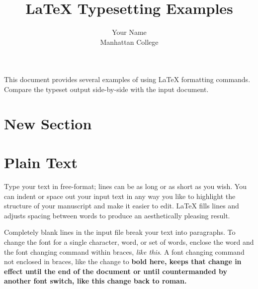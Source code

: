 \documentclass[11pt]{article}
\begin{document}
\title{LaTeX Typesetting Examples}
\author{Your Name\\
Manhattan College}
\renewcommand{\today}{February 19, 2019}
\maketitle
This document provides several examples of using LaTeX formatting commands.
Compare the typeset output side-by-side with the input document.

\begin{figure}[!h]
\end{figure}
\section{New Section}

\section {Plain Text}
Type your text in free-format; lines can be as long
or as short
as you wish.
        You can indent         or space out
        your input 
            text in 
                any way you like to highlight the structure
        of your manuscript and make it easier to edit.
LaTeX fills lines and adjusts spacing between words to produce an
aesthetically pleasing result.

Completely blank lines in the input file break your text into
paragraphs.
To change the font for a single character, word, or set of words, 
enclose the word and the font changing command within braces, 
{\em like this}.
A font changing command not enclosed in braces, like the change to \bf 
bold here, keeps that change in effect until the end of the document or
until countermanded by another font switch, like this change back to 
\rm roman.
\end{document}

